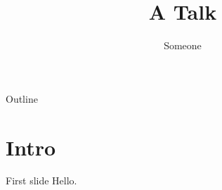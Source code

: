 \documentclass{beamer}
\title{A Talk}
\author{Someone}
\begin{document}
\begin{frame}
\titlepage
\end{frame}
\begin{frame}{Outline}
\tableofcontents
\end{frame}
\section{Intro}
\begin{frame}{First slide}
Hello.
\end{frame}
\end{document}
